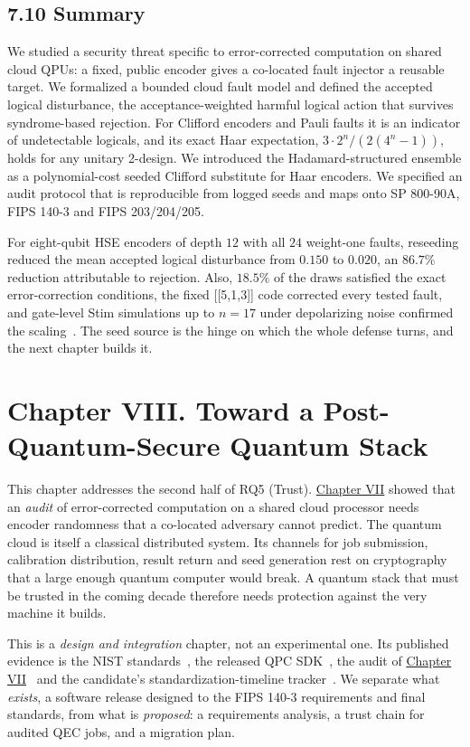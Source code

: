 \documentclass{report}
\theoremstyle{plain}
\theoremstyle{definition}
\theoremstyle{remark}
\begin{document}
\section{7.10 Summary}\label{sec:qec:summary}

We studied a security threat specific to error-corrected computation on shared cloud QPUs: a fixed, public encoder gives a co-located fault injector a reusable target. We formalized a bounded cloud fault model and defined the accepted logical disturbance, the acceptance-weighted harmful logical action that survives syndrome-based rejection. For Clifford encoders and Pauli faults it is an indicator of undetectable logicals, and its exact Haar expectation, $3\cdot 2^{n}/(2(4^{n}-1))$, holds for any unitary 2-design. We introduced the Hadamard-structured ensemble as a polynomial-cost seeded Clifford substitute for Haar encoders. We specified an audit protocol that is reproducible from logged seeds and maps onto SP 800-90A, FIPS 140-3 and FIPS 203/204/205.

For eight-qubit HSE encoders of depth $12$ with all $24$ weight-one faults, reseeding reduced the mean accepted logical disturbance from $0.150$ to $0.020$, an $86.7\%$ reduction attributable to rejection. Also, $18.5\%$ of the draws satisfied the exact error-correction conditions, the fixed [[5,1,3]] code corrected every tested fault, and gate-level Stim simulations up to $n=17$ under depolarizing noise confirmed the scaling~\cite{guo2026qecaudit}. The seed source is the hinge on which the whole defense turns, and the next chapter builds it.


\chapter{Chapter VIII. Toward a Post-Quantum-Secure Quantum Stack}\label{ch:pqc}

This chapter addresses the second half of RQ5 (Trust). \hyperref[ch:qec]{Chapter VII} showed that an \emph{audit} of error-corrected computation on a shared cloud processor needs encoder randomness that a co-located adversary cannot predict. The quantum cloud is itself a classical distributed system. Its channels for job submission, calibration distribution, result return and seed generation rest on cryptography that a large enough quantum computer would break. A quantum stack that must be trusted in the coming decade therefore needs protection against the very machine it builds.

This is a \emph{design and integration} chapter, not an experimental one. Its published evidence is the NIST standards~\cite{nist2024fips203,nist2024fips204,nist2024fips205,nist2019fips1403,nist2015sp80090a}, the released QPC SDK~\cite{guo2026lightriderqpc}, the audit of \hyperref[ch:qec]{Chapter VII}~\cite{guo2026qecaudit} and the candidate's standardization-timeline tracker~\cite{guo2026nisttracker}. We separate what \emph{exists}, a software release designed to the FIPS 140-3 requirements and final standards, from what is \emph{proposed}: a requirements analysis, a trust chain for audited QEC jobs, and a migration plan.
\end{document}
